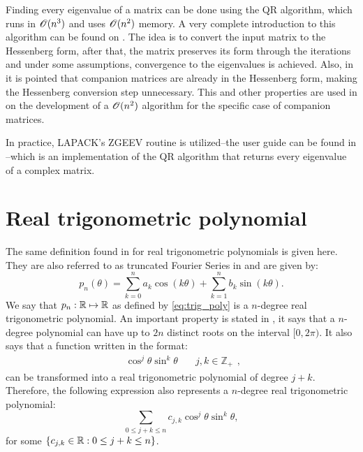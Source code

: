  Finding every eigenvalue of a matrix can be done using the QR algorithm, which runs in $\mathscr{O}(n^3)$ and uses $\mathscr{O}(n^2)$ memory. A very complete introduction to this algorithm can be found on . The idea is to convert the input matrix to the Hessenberg form, after that, the matrix preserves its form through the iterations and under some assumptions, convergence to the eigenvalues is achieved.
 Also, in  it is pointed that companion matrices are already in the Hessenberg form, making the Hessenberg conversion step unnecessary. This and other properties are used in  on the development of a $\mathscr{O}(n^2)$ algorithm for the specific case of companion matrices.
 
 In practice, LAPACK's ZGEEV routine is utilized--the user guide can be found in --which is an implementation of the QR algorithm that returns every eigenvalue of a complex matrix.
 
\section{Real trigonometric polynomial}

The same definition found in  for real trigonometric polynomials is given here. They are also referred to as truncated Fourier Series in  and are given by:
\begin{equation}\label{eq:trig_poly}
p_n(\theta) = \sum_{k=0}^{n} a_k\cos(k\theta) + \sum_{k=1}^{n} b_k\sin(k\theta).
\end{equation}
We say that $p_n: \mathbb{R} \mapsto \mathbb{R}$ as defined by \autoref{eq:trig_poly} is a $n$-degree real trigonometric polynomial. An important property is stated in , it says that a $n$-degree polynomial can have up to $2n$ distinct roots on the interval $[0, 2\pi)$. It also says that a function written in the format:
$$\begin{array}{cc}\cos^j{\theta}\sin^k{\theta} & \quad j, k \in \mathbb{Z}_+ \end{array},$$
can be transformed into a real trigonometric polynomial of degree $j+k$. Therefore, the following expression also represents a $n$-degree real trigonometric polynomial:
\begin{equation}\label{eq:trig_poly_2}
\sum_{0 \le j+k \le n}c_{j,k}\cos^j{\theta}\sin^k{\theta},
\end{equation}
for some $\{c_{j,k} \in \mathbb{R}: 0 \le j+k \le n\}$.